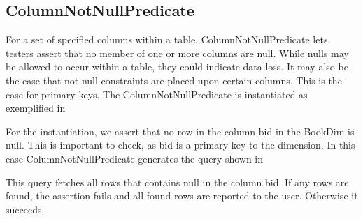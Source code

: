 \subsection{ColumnNotNullPredicate}
For a set of specified columns within a table, ColumnNotNullPredicate lets testers assert that no member of one or more columns  are null. While nulls may be allowed to occur within a table, they could indicate data loss. It may also be the case that not null constraints are placed upon certain columns. This is the case for primary keys. The ColumnNotNullPredicate is instantiated as exemplified in 


For the instantiation, we assert that no row in the column bid in the BookDim is null. This is important to check, as bid is a primary key to the dimension. In this case
ColumnNotNullPredicate generates the query shown in 


This query fetches all rows that contains null in the column bid. If any rows are found, the assertion fails and all found rows are reported to the user. Otherwise it succeeds.